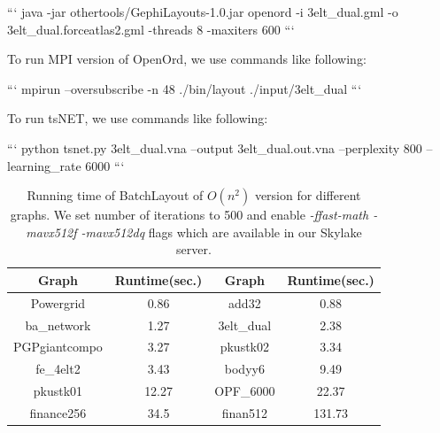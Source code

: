 \documentclass[conference]{article}
\begin{document}
\begin{markdown}
```
java -jar othertools/GephiLayouts-1.0.jar openord -i 3elt_dual.gml -o 3elt_dual.forceatlas2.gml -threads 8 -maxiters 600
```
\end{markdown}
\newline
\noindent{}\noindent{}\noindent{}To run MPI version of OpenOrd, we use commands like following:

\begin{markdown}
```
mpirun --oversubscribe -n 48 ./bin/layout ./input/3elt_dual
```
\end{markdown}
\newline
\noindent{}\noindent{}\noindent{}To run tsNET, we use commands like following:

\begin{markdown}
```
python tsnet.py 3elt_dual.vna --output 3elt_dual.out.vna --perplexity 800 --learning_rate 6000
```
\end{markdown}

\begin{table}[t]
\caption{Running time of BatchLayout of $O(n^2)$ version for different graphs. We set number of iterations to 500 and enable \emph{-ffast-math -mavx512f -mavx512dq} flags which are available in our Skylake server.}

\centering
\begin{tabular}{|c|c|c|c|}
\hline
\textbf{Graph} & \textbf{Runtime(sec.)} & \textbf{Graph} & \textbf{Runtime(sec.)} \\ \hline

Powergrid &	0.86	 &	add32 &	0.88	\\ \hline
ba\_network  &	1.27 &	3elt\_dual & 2.38 \\ \hline	PGPgiantcompo &	3.27 & pkustk02 &	3.34 \\ \hline
fe\_4elt2 &	3.43	&		bodyy6 &	9.49 \\ \hline	pkustk01 &		12.27 &	OPF\_6000 &		22.37 \\ \hline finance256  & 34.5 &		finan512 & 131.73\\ \hline
\end{tabular}
\label{tab:measures_batchlayout_time}
\end{table}
\end{document}
